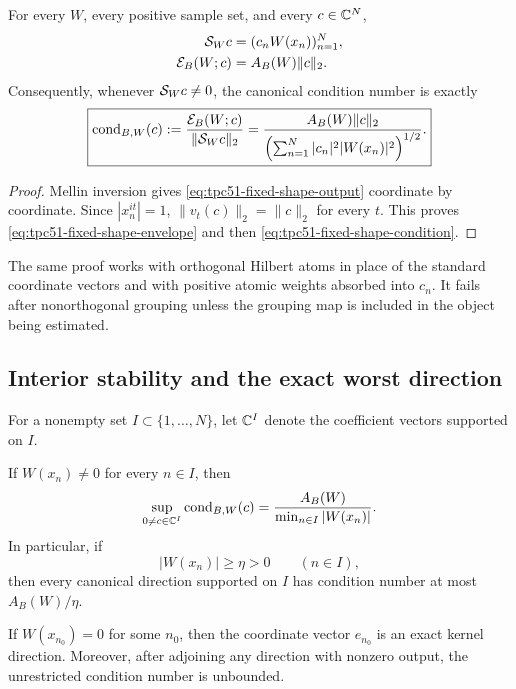 \begin{theorem}
\label{thm:tpc51-fixed-shape-identity}
\label{thm:tpc51-canonical-mellin-direction}
For every \(W\), every positive sample set, and every \(c\in\mathbb C^N\),
\begin{align}
 \mathcal S_Wc&=(c_nW(x_n))_{n=1}^N,
 \label{eq:tpc51-fixed-shape-output}\\
 \mathcal E_B(W;c)&=A_B(W)\|c\|_2.
 \label{eq:tpc51-fixed-shape-envelope}
\end{align}
Consequently, whenever \(\mathcal S_Wc\ne0\), the canonical condition number
is exactly
\begin{equation}
 \boxed{
 \operatorname{cond}_{B,W}(c)
 :=\frac{\mathcal E_B(W;c)}{\|\mathcal S_Wc\|_2}
 =\frac{A_B(W)\|c\|_2}
 {\left(\sum_{n=1}^N|c_n|^2|W(x_n)|^2\right)^{1/2}}.}
 \label{eq:tpc51-fixed-shape-condition}
\end{equation}
\end{theorem}

\begin{proof}
Mellin inversion gives \eqref{eq:tpc51-fixed-shape-output}
coordinate by coordinate.  Since \(|x_n^{it}|=1\),
\(\|v_t(c)\|_2=\|c\|_2\) for every \(t\).  This proves
\eqref{eq:tpc51-fixed-shape-envelope} and then
\eqref{eq:tpc51-fixed-shape-condition}.
\end{proof}

The same proof works with orthogonal Hilbert atoms in place of the
standard coordinate vectors and with positive atomic weights absorbed
into \(c_n\).  It fails after nonorthogonal grouping unless the grouping
map is included in the object being estimated.

\subsection{Interior stability and the exact worst direction}

For a nonempty set \(I\subset\{1,\ldots,N\}\), let \(\mathbb C^I\) denote the
coefficient vectors supported on \(I\).

\begin{corollary}
\label{cor:tpc51-interior-minimax}
If \(W(x_n)\ne0\) for every \(n\in I\), then
\begin{equation}
 \sup_{0\ne c\in\mathbb C^I}
 \operatorname{cond}_{B,W}(c)
 =\frac{A_B(W)}{\min_{n\in I}|W(x_n)|}.
 \label{eq:tpc51-interior-minimax}
\end{equation}
In particular, if
\begin{equation}
 |W(x_n)|\ge\eta>0
 \qquad(n\in I),
 \label{eq:tpc51-interior-lower}
\end{equation}
then every canonical direction supported on \(I\) has condition number
at most \(A_B(W)/\eta\).

If \(W(x_{n_0})=0\) for some \(n_0\), then the coordinate vector
\(e_{n_0}\) is an exact kernel direction.  Moreover, after adjoining
any direction with nonzero output, the unrestricted condition number is
unbounded.
\end{corollary}

